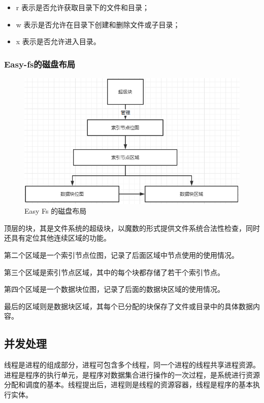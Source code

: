 \begin{itemize}
\item r 表示是否允许获取目录下的文件和目录；
\item w 表示是否允许在目录下创建和删除文件或子目录；
\item x 表示是否允许进入目录。
\end{itemize}


\subsubsection{Easy-fs的磁盘布局}

\begin{figure}[htb]
    \figureCapSet
    \centering
    \includegraphics[width=.8\linewidth]{figure/c3/easyfsdevicemap.png}
    \caption{Easy Fs 的磁盘布局}
    \label{figure:c3easyfsdevicemap}
\end{figure}


顶层的块，其是文件系统的超级块，以魔数的形式提供文件系统合法性检查，同时还具有定位其他连续区域的功能。

第二个区域是一个索引节点位图，记录了后面区域中节点使用的使用情况。

第三个区域是索引节点区域，其中的每个块都存储了若干个索引节点。

第四个区域是一个数据块位图，记录了后面的数据块区域的使用情况。

最后的区域则是数据块区域，其每个已分配的块保存了文件或目录中的具体数据内容。


\subsection{并发处理}

线程是进程的组成部分，进程可包含多个线程，同一个进程的线程共享进程资源。 进程是程序的执行单元，是程序对数据集合进行操作的一次过程，是系统进行资源分配和调度的基本。线程提出后，进程则是线程的资源容器，线程是程序的基本执行实体。

